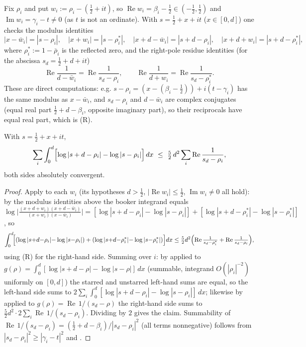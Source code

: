 Fix $\rho_i$ and put $w_i:=\rho_i-(\tfrac12+it)$, so $\operatorname{Re}w_i=\beta_i-\tfrac12
\in(-\tfrac12,\tfrac12)$ and $\operatorname{Im}w_i=\gamma_i-t\neq0$ (as $t$ is not an
ordinate). With $s=\tfrac12+x+it$ ($x\in[0,d]$) one checks the modulus identities
\[
  |x-\bar w_i|=|s-\rho_i|,\quad |x+w_i|=|s-\rho_i^{*}|,\quad
  |x+d-\bar w_i|=|s+d-\rho_i|,\quad |x+d+w_i|=|s+d-\rho_i^{*}|,
\]
where $\rho_i^{*}:=1-\bar\rho_i$ is the reflected zero, and the right-pole residue
identities (for the abscissa $s_d=\tfrac12+d+it$)
\[
  \operatorname{Re}\frac1{d-\bar w_i}=\operatorname{Re}\frac1{s_d-\rho_i},\qquad
  \operatorname{Re}\frac1{d+w_i}=\operatorname{Re}\frac1{s_d-\rho_i^{*}}.
\tag{R}
\]
These are direct computations: e.g. $s-\rho_i=(x-(\beta_i-\tfrac12))+i(t-\gamma_i)$ has
the same modulus as $x-\bar w_i$, and $s_d-\rho_i$ and $d-\bar w_i$ are complex
conjugates (equal real part $\tfrac12+d-\beta_i$, opposite imaginary part), so their
reciprocals have equal real part, which is (R).

\begin{lemma}
\label{lem:ll_booker_sum}
\leanok
{}
With $s=\tfrac12+x+it$,
\[
  \sum_i\int_0^d\Bigl[\log|s+d-\rho_i|-\log|s-\rho_i|\Bigr]\,dx
  \ \le\ \tfrac52\,d^2\sum_i\operatorname{Re}\frac1{s_d-\rho_i},
\]
both sides absolutely convergent.
\end{lemma}

\begin{proof}
\leanok
{}
Apply  to each $w_i$ (its hypotheses $d>\tfrac12$,
$|\operatorname{Re}w_i|\le\tfrac12$, $\operatorname{Im}w_i\neq0$ all hold): by the
modulus identities above the booker integrand equals
$\log\bigl|\tfrac{(x+d+w_i)(x+d-\bar w_i)}{(x+w_i)(x-\bar w_i)}\bigr|
=[\log|s+d-\rho_i|-\log|s-\rho_i|]+[\log|s+d-\rho_i^{*}|-\log|s-\rho_i^{*}|]$, so
\[
  \int_0^d\!\Bigl[(\log|s{+}d{-}\rho_i|{-}\log|s{-}\rho_i|)+(\log|s{+}d{-}\rho_i^{*}|{-}\log|s{-}\rho_i^{*}|)\Bigr]dx
  \le \tfrac52 d^2\Bigl(\operatorname{Re}\tfrac1{s_d-\rho_i^{*}}+\operatorname{Re}\tfrac1{s_d-\rho_i}\Bigr),
\]
using (R) for the right-hand side. Summing over $i$: by 
applied to $g(\rho)=\int_0^d[\log|s+d-\rho|-\log|s-\rho|]\,dx$ (summable, integrand
$O(|\rho_i|^{-2})$ uniformly on $[0,d]$) the starred and unstarred left-hand sums are
equal, so the left-hand side sums to
$2\sum_i\int_0^d[\log|s+d-\rho_i|-\log|s-\rho_i|]\,dx$; likewise by
 applied to $g(\rho)=\operatorname{Re}\,1/(s_d-\rho)$ the
right-hand side sums to $\tfrac52 d^2\cdot2\sum_i\operatorname{Re}\,1/(s_d-\rho_i)$.
Dividing by $2$ gives the claim. Summability of $\operatorname{Re}\,1/(s_d-\rho_i)
=(\tfrac12+d-\beta_i)/|s_d-\rho_i|^2$ (all terms nonnegative) follows from
$|s_d-\rho_i|^2\ge|\gamma_i-t|^2$ and .
\end{proof}

